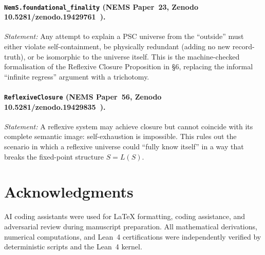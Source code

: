 \documentclass[11pt]{article}
\begin{document}
\begin{sloppypar}
\paragraph{\texttt{NemS.foundational\_finality} (NEMS Paper~23,
Zenodo 10.5281/\allowbreak zenodo.19429761~\cite{SpivackNEMS23}).}
\textit{Statement:} Any attempt to explain a PSC universe from the
``outside'' must either violate self-containment, be physically
redundant (adding no new record-truth), or be isomorphic to the
universe itself. This is the machine-checked formalisation of the
Reflexive Closure Proposition in §6, replacing the informal
``infinite regress'' argument with a trichotomy.
\end{sloppypar}

\begin{sloppypar}
\paragraph{\texttt{ReflexiveClosure} (NEMS Paper~56, Zenodo
10.5281/\allowbreak zenodo.19429835~\cite{SpivackNEMS56}).}
\textit{Statement:} A reflexive system may achieve closure but cannot
coincide with its complete semantic image: self-exhaustion is
impossible. This rules out the scenario in which a reflexive universe
could ``fully know itself'' in a way that breaks the fixed-point
structure $S = L(S)$.
\end{sloppypar}

\section*{Acknowledgments}

\begin{sloppypar}
AI coding assistants were used for LaTeX formatting, coding assistance, and adversarial review during manuscript preparation. All mathematical derivations, numerical computations, and Lean~4 certifications were independently verified by deterministic scripts and the Lean~4 kernel.
\end{sloppypar}



\end{document}
